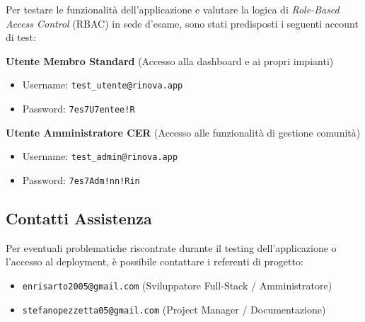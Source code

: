 Per testare le funzionalità dell'applicazione e valutare la logica di \textit{Role-Based Access Control} (RBAC) in sede d'esame, sono stati predisposti i seguenti account di test:

\textbf{Utente Membro Standard} (Accesso alla dashboard e ai propri impianti)
\begin{itemize}
    \item Username: \texttt{test\_utente@rinova.app}
    \item Password: \texttt{7es7U7entee!R}
\end{itemize}

\textbf{Utente Amministratore CER} (Accesso alle funzionalità di gestione comunità)
\begin{itemize}
    \item Username: \texttt{test\_admin@rinova.app}
    \item Password: \texttt{7es7Adm!nn!Rin}
\end{itemize}

\subsection{Contatti Assistenza}
Per eventuali problematiche riscontrate durante il testing dell'applicazione o l'accesso al deployment, è possibile contattare i referenti di progetto:
\begin{itemize}
    \item \texttt{enrisarto2005@gmail.com} (Sviluppatore Full-Stack / Amministratore)
    \item \texttt{stefanopezzetta05@gmail.com} (Project Manager / Documentazione)
\end{itemize}

